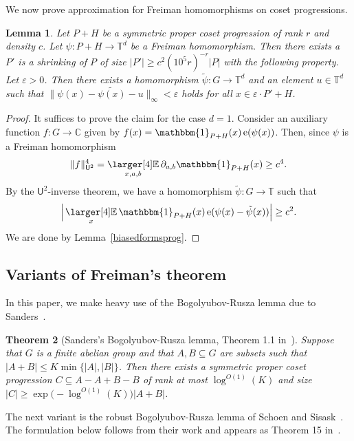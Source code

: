\documentclass[a4paper,11pt]{article}
\newtheorem{theorem}{Theorem}
\numberwithin{theorem}{section}
\newtheorem{lemma}[theorem]{Lemma}
\theoremstyle{definition}
\newcommand\id{\mathbbm{1}}
\newcommand{\on}[1]{
	\operatorname{#1}
}
\newcommand{\exx}{
  \mathop{
    \mathchoice{\vcenter{\hbox{\larger[4]$\mathbb{E}$}}}
               {\kern0pt\mathbb{E}}
               {\kern0pt\mathbb{E}}
               {\kern0pt\mathbb{E}}
  }\displaylimits
}
\begin{document}
We now prove approximation for Freiman homomorphisms on coset progressions.

\begin{lemma}\label{homapproxcosetp}
    Let $P + H$ be a symmetric proper coset progression of rank $r$ and density $c$. Let $\psi : P + H \to \mathbb{T}^d$ be a Freiman homomorphism. Then there exists a $P'$ is a shrinking of $P$ of size $|P'| \geq c^2(10^5r)^{-r}|P|$ with the following property.\\
    \indent Let $\varepsilon > 0$. Then there exists a homomorphism $\tilde{\psi} : G \to \mathbb{T}^d$ and an element $u \in \mathbb{T}^d$ such that $\|\psi(x) - \tilde{\psi(x)} - u\|_\infty < \varepsilon$ holds for all $x \in \varepsilon \cdot P' + H$.
\end{lemma}

\begin{proof}
    It suffices to prove the claim for the case $d = 1$. Consider an auxiliary function $f : G \to \mathbb{C}$ given by $f(x) = \id_{P + H}(x) \on{e}(\psi(x))$. Then, since $\psi$ is a Freiman homomorphism
    \[\|f\|_{\mathsf{U}^2}^4 = \exx_{x, a, b} \partial_{a,b}\id_{P + H}(x) \geq c^4.\]
    By the $\mathsf{U}^2$-inverse theorem, we have a homomorphism $\tilde{\psi} :G \to \mathbb{T}$ such that
    \[\Big|\exx_x \id_{P+ H}(x) \on{e}(\psi(x) - \tilde{\psi}(x))\Big| \geq c^2.\]
    We are done by Lemma~\ref{biasedformsprog}.
\end{proof}



\subsection{Variants of Freiman's theorem}

In this paper, we make heavy use of the Bogolyubov-Rusza lemma due to Sanders~\cite{Sanders}.

\begin{theorem}[Sanders's Bogolyubov-Rusza lemma, Theorem 1.1 in~\cite{Sanders}]\label{bogRuzsa1}Suppose that $G$ is a finite abelian group and that $A, B \subseteq G$ are subsets such that $|A + B| \leq K \min \{|A|, |B|\}$. Then there exists a symmetric proper coset progression $C \subseteq A - A + B - B$ of rank at most $\log^{O(1)} (K)$ and size $|C| \geq \exp\Big(-\log^{O(1)}(K)\Big)|A+B|$.\end{theorem}

The next variant is the robust Bogolyubov-Rusza lemma of Schoen and Sisask~\cite{SchSis}. The formulation below follows from their work and appears as Theorem 15 in~\cite{generalBilBog}.
\end{document}
